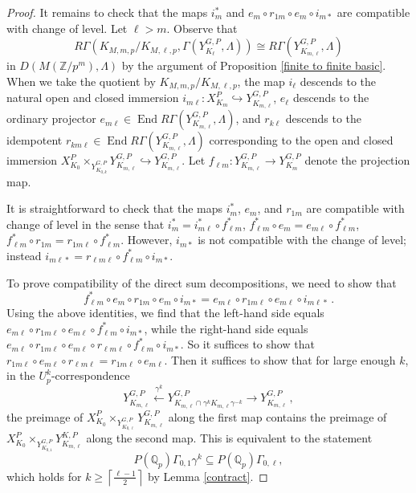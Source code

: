 \documentclass{amsart}
\theoremstyle{remark}
\numberwithin{equation}{subsection}
\newcommand{\Q}{\QQ}
\newcommand{\Z}{\ZZ}
\newcommand{\QQ}{{\mathbb Q}}
\newcommand{\ZZ}{{\mathbb Z}}
\newcommand{\Qp}{\Q_p}
\newcommand{\XP}[1][m]{X^{P}_{K_{#1}}}
\DeclareMathOperator{\End}{End}
\renewcommand{\(}{\left(}
\renewcommand{\)}{\right)}
\begin{document}
\begin{proof}
It remains to check that the maps $i_m^*$ and
$e_m \circ r_{1m} \circ e_m \circ i_{m*}$ are compatible with change of
level.  Let $\ell > m$.
Observe that
\[ R\Gamma(K_{M,m,p}/K_{M,\ell,p},\Gamma(Y^{G,P}_{K_{\ell}}, \Lambda)) \cong R\Gamma(Y^{G,P}_{K_{m,\ell}}, \Lambda) \]
in $D(M(\Z/p^{m}), \Lambda)$ by the argument of Proposition \ref{finite to finite basic}.
When we take the quotient by $K_{M,m,p}/K_{M,\ell,p}$,
the map $i_{\ell}$ descends to the natural open and closed immersion
$i_{m\ell} \colon \XP \hookrightarrow Y^{G,P}_{K_{m,\ell}}$,
$e_{\ell}$ descends to the ordinary projector $e_{m\ell} \in \End R\Gamma(Y^{G,P}_{K_{m,\ell}},\Lambda)$,
and $r_{k\ell}$ descends to the idempotent $r_{km\ell} \in \End R\Gamma(Y^{G,P}_{K_{m,\ell}},\Lambda)$
corresponding to
the open and closed immersion $X^P_{K_0} \times_{Y^{G,P}_{K_{0,k}}} Y^{G,P}_{K_{m,\ell}} \hookrightarrow Y^{G,P}_{K_{m,\ell}}$.  Let $f_{\ell m} \colon Y^{G,P}_{K_{m,\ell}} \to Y^{G,P}_{K_m}$ denote the projection map.

It is straightforward to check that the maps
$i_m^*$, $e_m$, and $r_{1m}$ are
compatible with change of level in the sense that
$i_m^* = i_{m\ell}^* \circ f_{\ell m}^*$, $f_{\ell m}^* \circ e_m = e_{m \ell} \circ f_{\ell m}^*$,
$f_{\ell m}^* \circ r_{1m} = r_{1m \ell} \circ f_{\ell m}^*$.  However, $i_{m*}$ is not compatible with the
change of level; instead $i_{m\ell*} = r_{\ell m\ell} \circ f_{\ell m}^* \circ i_{m*}$.

To prove compatibility of the direct sum decompositions, we need to show that
\[ f_{\ell m}^* \circ e_m \circ r_{1m} \circ e_m \circ i_{m*} = e_{m \ell} \circ r_{1m\ell} \circ e_{m\ell} \circ i_{m\ell *} \,. \]
Using the above identities, we find that the left-hand side equals
$e_{m \ell} \circ r_{1m \ell} \circ e_{m \ell} \circ f_{\ell m}^* \circ i_{m*}$,
while the right-hand side equals
$e_{m \ell} \circ r_{1m \ell} \circ e_{m \ell} \circ r_{\ell m\ell} \circ f_{\ell m}^* \circ i_{m*}$.
So it suffices to show that
$r_{1m \ell} \circ e_{m \ell} \circ r_{\ell m \ell} = r_{1m \ell} \circ e_{m\ell}$.
Then it suffices to show that for large enough $k$, in the
$U_p^k$-correspondence
\[ Y^{G,P}_{K_{m,\ell}} \xleftarrow{\gamma^k} Y^{G,P}_{K_{m,\ell}\cap \gamma^k K_{m,\ell}\gamma^{-k}} \to Y^{G,P}_{K_{m,\ell}} \,, \]
the preimage of $X^P_{K_{0}} \times_{Y^{G,P}_{K_{0,\ell}}} Y^{G,P}_{K_{m,\ell}}$
along the first map contains the preimage
of $X^P_{K_0} \times_{Y^{G,P}_{K_{0,1}}} Y^{K,P}_{K_{m,\ell}}$ along the second map.
This is equivalent to the statement
\[ P(\Qp) \Gamma_{0,1} \gamma^k \subseteq P(\Qp) \Gamma_{0,\ell}, \]
which holds for $k \ge \left\lceil \frac{\ell-1}{2} \right\rceil$
by Lemma \ref{contract}.


\end{proof}
\end{document}

